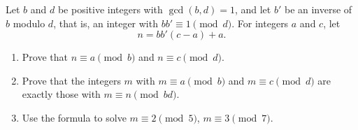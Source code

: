 Let $b$ and $d$ be positive integers with $\gcd(b,d)=1$, and let $b'$ be an inverse of $b$ modulo $d$, that is, an integer with $bb'\equiv1\pmod d$. For integers $a$ and $c$, let
\[n=bb'(c-a)+a.\]
\begin{enumerate}
\item[(a)] Prove that $n\equiv a\pmod b$ and $n\equiv c\pmod d$.
\item[(b)] Prove that the integers $m$ with $m\equiv a\pmod b$ and $m\equiv c\pmod d$ are exactly those with $m\equiv n\pmod{bd}$.
\item[(c)] Use the formula to solve $m\equiv2\pmod5$, $m\equiv3\pmod7$.
\end{enumerate}
